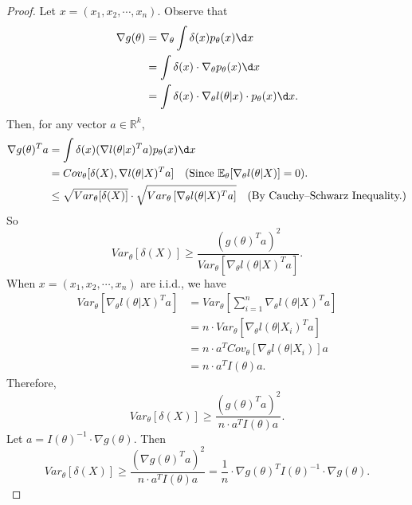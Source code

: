 \documentclass[a4paper]{article}
\begin{document}
\begin{proof}
	Let $x = (x_1,x_2,\cdots,x_n)$. Observe that
	\begin{equation*}
		\begin{aligned}
			\nabla g(\theta) &= \nabla_{\theta} \int \delta(x)p_{\theta}(x) \d x \\
			&= \int \delta(x) \cdot \nabla_{\theta}p_{\theta}(x) \d x \\
			&= \int \delta(x) \cdot \nabla_{\theta} l(\theta|x) \cdot p_{\theta}(x) \d x.
		\end{aligned}
	\end{equation*}
	Then, for any vector $a \in \mathbb{R}^k$,
	\begin{equation*}
		\begin{aligned}
			\nabla g(\theta)^T a &= \int \delta(x) (\nabla l(\theta|x)^T a) p_{\theta}(x) \d x \\
			&= Cov_{\theta}[\delta(X),\nabla l(\theta|X)^T a] \quad \text{(Since } \mathbb{E}_{\theta}[\nabla_{\theta}l(\theta|X)] = 0). \\
			&\leq \sqrt{Var_{\theta}[\delta(X)]} \cdot \sqrt{Var_{\theta}\left[\nabla_{\theta} l(\theta|X)^T a\right]} \quad \text{(By Cauchy–Schwarz Inequality.)}
		\end{aligned}
	\end{equation*}
	So
	\begin{equation*}
		Var_{\theta}[\delta(X)] \geq \frac{(g(\theta)^T a)^2}{Var_{\theta}\left[\nabla_{\theta} l(\theta|X)^T a\right]}.
	\end{equation*}
	When $x = (x_1,x_2,\cdots,x_n)$ are i.i.d., we have
	\begin{equation*}
		\begin{aligned}
			Var_{\theta}\left[\nabla_{\theta} l(\theta|X)^T a\right] &= Var_{\theta}\left[\sum\limits_{i=1}^n \nabla_{\theta} l(\theta|X)^T a\right] \\
			&= n \cdot Var_{\theta}\left[\nabla_{\theta} l(\theta|X_i)^T a\right] \\
			&= n \cdot a^T Cov_{\theta}[\nabla_{\theta} l(\theta|X_i)] a \\
			&= n \cdot a^T I(\theta) a.
		\end{aligned}
	\end{equation*}
	Therefore,
	\begin{equation*}
		Var_{\theta}[\delta(X)] \geq \frac{(g(\theta)^T a)^2}{n \cdot a^T I(\theta) a}.
	\end{equation*}
	Let $a = I(\theta)^{-1} \cdot \nabla g(\theta)$. Then
	\begin{equation}
		Var_{\theta}[\delta(X)] \geq \frac{(\nabla g(\theta)^Ta)^2}{n \cdot a^T I(\theta) a} = \frac{1}{n} \cdot \nabla g(\theta)^T I(\theta)^{-1} \cdot \nabla g(\theta).
	\end{equation}
\end{proof}
\end{document}
